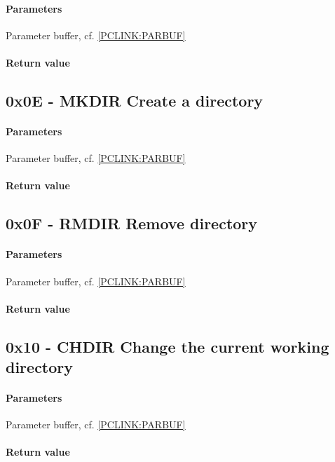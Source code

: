 \documentclass[10pt]{article}
\begin{document}
\paragraph{Parameters}
Parameter buffer, cf. \ref{PCLINK:PARBUF}

\paragraph{Return value}

\subsection{0x0E - MKDIR Create a directory }
\paragraph{Parameters}
Parameter buffer, cf. \ref{PCLINK:PARBUF}

\paragraph{Return value}

\subsection{0x0F - RMDIR Remove directory }
\paragraph{Parameters}
Parameter buffer, cf. \ref{PCLINK:PARBUF}

\paragraph{Return value}

\subsection{0x10 - CHDIR Change the current working directory }
\paragraph{Parameters}
Parameter buffer, cf. \ref{PCLINK:PARBUF}

\paragraph{Return value}
\end{document}
